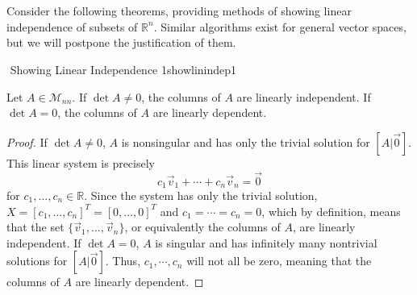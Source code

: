         \vphantom
        \\
        \\
        Consider the following theorems, providing methods of showing linear independence of subsets of \(\mathbb{R}^n\). Similar algorithms exist for general vector spaces, but we will postpone the justification of them.
        \begin{theorem}{\Stop\,\,Showing Linear Independence 1}{showlinindep1}

            Let \(A\in\mathcal{M}_{nn}\). If \(\det A \neq 0\), the columns of \(A\) are linearly independent. If \(\det A = 0\), the columns of \(A\) are linearly dependent.
            \begin{proof}
                If \(\det A\neq 0\), \(A\) is nonsingular and has only the trivial solution for \([A|\vec{0}]\). This linear system is precisely
                \begin{equation*}
                    c_1\vec{v}_1+\cdots+c_n\vec{v}_n=\vec{0}
                \end{equation*}
                for \(c_1,\ldots,c_n\in\mathbb{R}\). Since the system has only the trivial solution, \(X=[c_1,\ldots,c_n]^T=[0,\ldots,0]^T\) and \(c_1=\cdots=c_n=0\), which by definition, means that the set \(\{\vec{v}_1,\ldots,\vec{v}_n\}\), or equivalently the columns of \(A\), are linearly independent. If \(\det A =0\), \(A\) is singular and has infinitely many nontrivial solutions for \([A|\vec{0}]\). Thus, \(c_1,\cdots,c_n\) will not all be zero, meaning that the columns of \(A\) are linearly dependent.
            \end{proof}

        \end{theorem}
        \pagebreak
